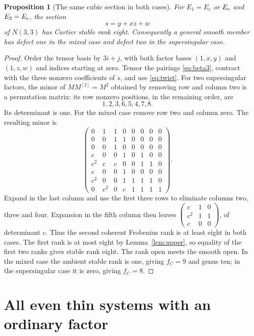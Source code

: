 \documentclass[11pt]{article}
\newtheorem{proposition}[theorem]{Proposition}
\theoremstyle{definition}\newtheorem{definition}[theorem]{Definition}
\theoremstyle{remark}\newtheorem{remark}[theorem]{Remark}
\begin{document}
\begin{proposition}[The same cubic section in both cases]\label{prop:cubic}
For $E_1=E_c$ or $E_{\rm s}$ and $E_2=E_{\rm s}$, the section
\[
                         s=y+xz+w
\]
of $N(3,3)$ has Cartier stable rank eight. Consequently a general smooth member has defect one in the mixed case and defect two in the supersingular case.
\end{proposition}
\begin{proof}
Order the tensor basis by $3i+j$, with both factor bases $(1,x,y)$ and $(1,z,w)$ and indices starting at zero. Tensor the pairings \eqref{eq:beta3}, contract with the three nonzero coefficients of $s$, and use \eqref{eq:twist}. For two supersingular factors, the minor of $MM^{[2]}=M^2$ obtained by removing row and column two is a permutation matrix: its row nonzero positions, in the remaining order, are
\[
                        1,2,3,6,5,4,7,8.
\]
Its determinant is one. For the mixed case remove row two and column zero. The resulting minor is
\begin{equation}\label{eq:cubic-minor}
 \begin{pmatrix}
0&1&1&0&0&0&0&0\\
0&0&1&1&0&0&0&0\\
0&0&1&0&0&0&0&0\\
c&0&0&1&0&1&0&0\\
c^2&c&c&0&0&1&1&0\\
c&0&0&1&0&0&0&0\\
c^2&0&0&1&1&1&1&0\\
0&c^2&0&c&1&1&1&1
 \end{pmatrix}.
\end{equation}
Expand in the last column and use the first three rows to eliminate columns two, three and four. Expansion in the fifth column then leaves
$\left(\begin{smallmatrix}c&1&0\\c^2&1&1\\c&0&0\end{smallmatrix}\right)$, of determinant $c$. Thus the second coherent Frobenius rank is at least eight in both cases. The first rank is at most eight by Lemma~\ref{lem:upper}, so equality of the first two ranks gives stable rank eight. The rank open meets the smooth open. In the mixed case the ambient stable rank is one, giving $f_C=9$ and genus ten; in the supersingular case it is zero, giving $f_C=8$.
\end{proof}

\section{All even thin systems with an ordinary factor}\label{sec:mixed}
\end{document}
